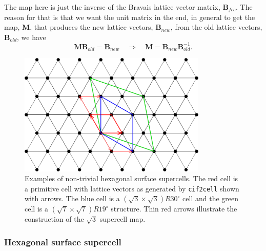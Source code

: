 \documentclass[11pt]{article}
\newcommand{\ciftocell}{\texttt{cif2cell}}
\begin{document}
The map here is just the inverse of the Bravais lattice vector matrix, $\mathbf{B}_{fcc}$. The reason for that is that we want the unit matrix in the end, in general to get the map, $\mathbf{M}$, that produces the new lattice vectors, $\mathbf{B}_{new}$, from the old lattice vectors, $\mathbf{B}_{old}$, we have
\begin{equation}
\mathbf{M}\mathbf{B}_{old} = \mathbf{B}_{new}\quad \Rightarrow\quad \mathbf{M} = \mathbf{B}_{new}\mathbf{B}_{old}^{-1}.
\end{equation}

\begin{figure}[htbp] %
   \centering
   \includegraphics[width=0.8\textwidth]{honeycomb.pdf}
   \caption{Examples of non-trivial hexagonal surface supercells. The red cell is a primitive cell with lattice vectors as generated by \ciftocell{} shown with arrows. The blue cell is a $(\sqrt{3} \times \sqrt{3})R30^{\circ}$ cell and the green cell is a $(\sqrt{7}\times\sqrt{7})R19^{\circ}$ structure. Thin red arrows illustrate the construction of the $\sqrt{3}$ supercell map.}
   \label{surfacesupercells}
\end{figure}

\subsubsection{Hexagonal surface supercell}
\end{document}
